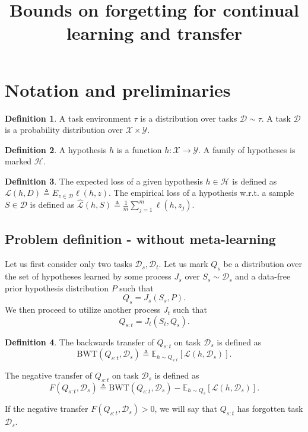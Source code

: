 \documentclass[letterpaper]{article}
\title{Bounds on forgetting for continual learning and transfer}
\theoremstyle{definition}
\newtheorem{defn}{Definition}[section]
\begin{document}
	
	\maketitle
	
\section{Notation and preliminaries}

\begin{defn}
	A task environment $\tau$ is a distribution over tasks $\mathcal{D}\sim \tau$. A task $\mathcal{D}$ is a probability distribution over $\mathcal{X}\times \mathcal{Y}$.
\end{defn}


\begin{defn}
	A hypothesis $h$ is a function $h:\mathcal{X}\rightarrow\mathcal{Y}$. A family of hypotheses is marked $\mathcal{H}$. 
\end{defn}

\begin{defn}
	The expected loss of a given hypothesis $h\in \mathcal{H}$ is defined as $\mathcal{L}(h, D) \triangleq E_{z\in \mathcal{D}} \ell(h, z)$. The empirical loss of a hypothesis w.\!r.\!t.\! a sample $S\in \mathcal{D}$ is defined as $\hat{\mathcal{L}}(h, S) \triangleq \frac{1}{m}\sum_{j=1}^{m}\ell(h, z_j)$.
\end{defn}

\subsection{Problem definition - without meta-learning} \label{sec:forgetting-formulation}

Let us first consider only two tasks $\mathcal{D}_s, \mathcal{D}_t$. Let us mark $Q_s$ be a distribution over the set of hypotheses learned by some process $J_s$ over $S_s\sim \mathcal{D}_s$ and a data-free prior hypothesis distribution $P$ such that $$Q_s=J_s(S_s, P).$$ We then proceed to utilize another process $J_t$ such that $$Q_{s:t}=J_t(S_t, Q_s).$$ 

\begin{defn}
	The backwards transfer of $Q_{s:t}$ on task $\mathcal{D}_s$ is defined as $$\mathrm{BWT}(Q_{s:t}, \mathcal{D}_s) \triangleq \mathbb{E}_{h\sim Q_{s:t}}\left [\mathcal{L}(h, \mathcal{D}_s)\right ].$$
	
	The negative transfer of $Q_{s:t}$ on task $\mathcal{D}_s$ is defined as $$F(Q_{s:t}, \mathcal{D}_s) \triangleq \mathrm{BWT}(Q_{s:t}, \mathcal{D}_s) - \mathbb{E}_{h\sim Q_{s}}\left [\mathcal{L}(h, \mathcal{D}_s)\right ].$$
	
	If the negative transfer $F(Q_{s:t}, \mathcal{D}_s)>0$, we will say that $Q_{s:t}$ has forgotten task $\mathcal{D}_s$.
\end{defn}
\end{document}
